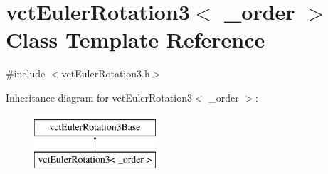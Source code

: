 \hypertarget{classvct_euler_rotation3}{}\section{vct\+Euler\+Rotation3$<$ \+\_\+order $>$ Class Template Reference}
\label{classvct_euler_rotation3}


{\ttfamily \#include $<$vct\+Euler\+Rotation3.\+h$>$}

Inheritance diagram for vct\+Euler\+Rotation3$<$ \+\_\+order $>$\+:\begin{figure}[H]
\begin{center}
\leavevmode
\includegraphics[height=2.000000cm]{d0/d33/classvct_euler_rotation3}
\end{center}
\end{figure}

